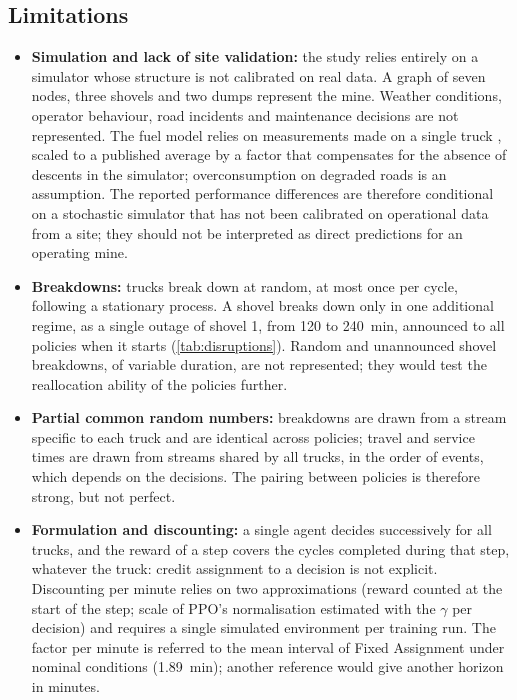 \documentclass[11pt,a4paper]{article}
\newif\ifrevmarks
\newcommand{\revtag}[1]{\ifrevmarks\textsuperscript{\textcolor{red!70!black}{\scriptsize[#1]}}\fi}
\newenvironment{revbloc}[1]{\par\ifrevmarks\color{revcolor}\noindent\revtag{#1}\ \fi}{\par}
\newif\ifcorrmarks
\newcommand{\corr}[1]{\ifcorrmarks\textcolor{corrcolor}{#1}\else#1\fi}
\begin{document}
\subsection{Limitations}
\label{sec:limitations}

\begin{revbloc}{M7, M8, M9, M11, M12, M25, N1--N5, v3, T31}
\begin{itemize}
  \item \textbf{Simulation and lack of site validation:} the study relies entirely on a simulator whose structure is not calibrated on real data. A graph of seven nodes, three shovels and two dumps represent the mine. Weather conditions, operator behaviour, road incidents and maintenance decisions are not represented. The fuel model relies on measurements made on a single truck \cite{Kubler2015}, scaled to a published average by a factor that compensates for the absence of descents in the simulator; overconsumption on degraded roads is an assumption. \corr{The reported performance differences are therefore conditional on a stochastic simulator that has not been calibrated on operational data from a site; they should not be interpreted as direct predictions for an operating mine.}
  \item \textbf{Breakdowns:} \corr{trucks break down at random}, at most once per cycle, following a stationary process. \corr{A shovel breaks down only in one additional regime, as a single outage of shovel 1, from 120 to 240~min, announced to all policies when it starts (\cref{tab:disruptions}). Random and unannounced shovel breakdowns, of variable duration, are not represented; they would test the reallocation ability of the policies further.}
  \item \textbf{Partial common random numbers:} breakdowns are drawn from a stream specific to each truck and are identical across policies; travel and service times are drawn from streams shared by all trucks, in the order of events, which depends on the decisions. The pairing between policies is therefore strong, but not perfect.
  \item \textbf{Formulation and discounting:} a single agent decides successively for all trucks, and the reward of a step covers the cycles completed during that step, whatever the truck: credit assignment to a decision is not explicit. Discounting per minute relies on two approximations (reward counted at the start of the step; scale of PPO's normalisation estimated with the $\gamma$ per decision) and requires a single simulated environment per training run. The factor per minute is referred to the mean interval of Fixed Assignment under nominal conditions (1.89~min); another reference would give another horizon in minutes.

\end{itemize}
\end{revbloc}
\end{document}
